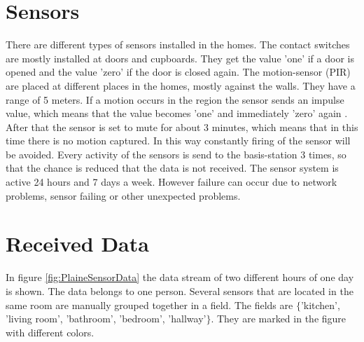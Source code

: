 \section{Sensors}
There are different types of sensors installed in the homes. The contact switches are mostly installed at doors and cupboards. They get the value 'one' if a door is opened and the value 'zero' if the door is closed again.
The motion-sensor (PIR) are placed at different places in the homes, mostly against the walls. They have a range of 5 meters. If a motion occurs in the region the sensor sends an impulse value, which means that the value becomes 'one' and immediately 'zero' again . After that the sensor is set to mute for about 3 minutes, which means that in this time there is no motion captured. In this way constantly firing of the sensor will be avoided. Every activity of the sensors is send to the basis-station 3 times, so that the chance is reduced that the data is not received. The sensor system is active 24 hours and 7 days a week. However failure can occur due to network problems, sensor failing or other unexpected problems.

\section{Received Data}
In figure \ref{fig:PlaineSensorData} the data stream of two different hours of one day is shown. The data belongs to one person. Several sensors that are located in the same room are manually grouped together in a field. The fields are $\{$'kitchen', 'living room', 'bathroom', 'bedroom', 'hallway'$\}$. They are marked in the figure with different colors.

